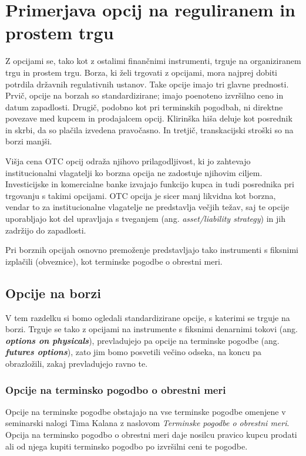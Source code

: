 \documentclass[a4paper]{article}
\begin{document}
\section{Primerjava opcij na reguliranem in prostem trgu}
Z opcijami se, tako kot z ostalimi finančnimi instrumenti, trguje na organiziranem trgu in prostem trgu. Borza, ki želi trgovati
z opcijami, mora najprej dobiti potrdila državnih regulativnih ustanov. Take opcije imajo tri glavne prednosti. Prvič, opcije na borzah
so standardizirane; imajo poenoteno izvršilno ceno in datum zapadlosti. Drugič, podobno kot pri terminskih pogodbah, ni direktne povezave
med kupcem in prodajalcem opcij. Klirinška hiša deluje kot posrednik in skrbi, da so plačila izvedena pravočasno. In tretjič, transkacijski
stroški so na borzi manjši. 

Višja cena OTC opcij odraža njihovo prilagodljivost, ki jo zahtevajo institucionalni vlagatelji ko borzna opcija ne zadostuje
njihovim ciljem. Investicijske in komercialne banke izvajajo funkcijo kupca in tudi posrednika pri trgovanju s takimi
opcijami. OTC opcija je sicer manj likvidna kot borzna, vendar to za institucionalne vlagatelje ne predstavlja večjih težav, 
saj te opcije uporabljajo kot del upravljaja s tveganjem (ang. \textit{asset/liability strategy}) in jih zadržijo do zapadlosti.

Pri borznih opcijah osnovno premoženje predstavljajo tako instrumenti s fiksnimi izplačili (obveznice),
kot terminske pogodbe o obrestni meri.

\subsection{Opcije na borzi}
V tem razdelku si bomo ogledali standardizirane opcije, s katerimi se trguje na borzi. Trguje se 
tako z opcijami na instrumente s fiksnimi denarnimi tokovi  (ang. \textit{\textbf{options on physicals}}), 
prevladujejo pa opcije na terminske pogodbe (ang. \textit{\textbf{futures options}}),
zato jim bomo posvetili večino odseka, na koncu pa obrazložili, zakaj prevladujejo ravno te.

\subsubsection{Opcije na terminsko pogodbo o obrestni meri}
Opcije na terminske pogodbe obstajajo na vse terminske pogodbe omenjene v seminarski nalogi Tima Kalana z naslovom \textit{Terminske
pogodbe o obrestni meri}. Opcija na terminsko pogodbo o obrestni meri  daje nosilcu pravico
kupcu prodati ali od njega kupiti terminsko pogodbo po izvršilni ceni te pogodbe.
\end{document}
